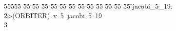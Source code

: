 %
%
\begin{tabbing}
55555 \= 55 \= 55 \= 55 \= 55 \= 55 \= 55 \= 55 \= 55 \= 55 \= 55 \= 55 \= 55 \= \>jacobi\_5\_19:\\[0pt]
2\>$\triangleright$\>(ORBITER)\ v\ 5\ jacobi\ 5\ 19\\[0pt]
3\>\end{tabbing}
